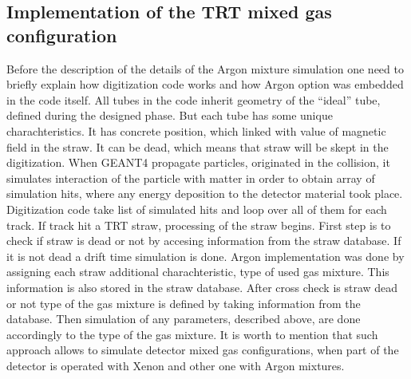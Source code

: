 \subsection{Implementation of the TRT mixed gas configuration}
Before the description of the details of the Argon mixture simulation one need to briefly explain how digitization code works and how Argon option was embedded in the code itself.
All tubes in the code inherit geometry of the ``ideal'' tube, defined during the designed phase. But each tube has some unique charachteristics. It has concrete position, 
which linked with value of magnetic field in the straw. It can be dead, which means that straw will be skept in the digitization.
When GEANT4 propagate particles, originated in the collision, it simulates interaction of the particle with matter in order to obtain array of simulation hits, where any energy deposition to the 
detector material took place. Digitization code take list of simulated hits and loop over all of them for each track. If track hit a TRT straw, processing of the straw begins.
First step is to check if straw is dead or not by accesing information from the straw database.
If it is not dead a drift time simulation is done.
Argon implementation was done by assigning each straw additional charachteristic, type of used gas mixture. This information is also stored in the straw database.
After cross check is straw dead or not type of the gas mixture is defined by taking information from the database.
Then simulation of any parameters, described above, are done accordingly to the type of the gas mixture.
It is worth to mention that such approach allows to simulate detector mixed gas configurations, when part of the detector is operated with Xenon and other one with Argon mixtures.

